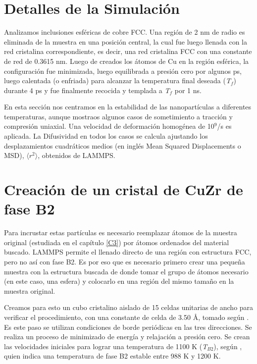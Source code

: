 
\section{Detalles de la Simulación}
\label{S4_1}

Analizamos inclusiones esféricas de cobre FCC. Una región de 2 nm de radio es eliminada de la muestra en una posición central, la cual fue luego llenada con la red cristalina correspondiente, es decir, una red cristalina FCC con una constante de red de 0.3615 nm. Luego de creados los átomos de Cu en la región esférica, la configuración fue minimizada, luego equilibrada a presión cero por algunos ps, luego calentada (o enfriada) para alcanzar la temperatura final deseada (\textit{T$_{f}$}) durante 4 ps y fue finalmente recocida y templada a \textit{T$_{f}$} por 1 ns.

En esta sección nos centramos en la estabilidad de las nanopartículas a diferentes temperaturas, aunque mostraos algunos casos de sometimiento a tracción y compresión uniaxial. Una velocidad de deformación homogénea de 10$^{9}$/s es aplicada. La Difusividad en todos los casos se calcula ajustando los desplazamientos cuadráticos medios (en inglés Mean Squared Displacements o MSD), $\langle r^{2}\rangle$, obtenidos de LAMMPS.

\section{Creación de un cristal de CuZr de fase B2}
\label{S4_2}

Para incrustar estas partículas es necesario reemplazar átomos de la muestra original (estudiada en el capítulo \ref{C3}) por átomos ordenados del material buscado. LAMMPS permite el llenado directo de una región con estructura FCC, pero no así con fase B2. Es por eso que es necesario  primero crear una pequeña muestra con la estructura buscada de donde tomar el grupo de átomos necesario (en este caso, una esfera) y colocarlo en una región del mismo tamaño en la muestra original.

Creamos para esto un cubo cristalino aislado de 15 celdas unitarias de ancho para verificar el procedimiento, con una constante de celda de 3.50 \AA{}, tomado según \cite{inoue04}. Es este paso se utilizan condiciones de borde periódicas en las tres direcciones. Se realiza un proceso de minimizado de energía y relajación a presión cero. Se crean las velocidades iniciales para lograr una temperatura de 1100 K (\textit{T$_{B2}$}), según \cite{pauly10}, quien indica una temperatura de fase B2 estable entre 988 K y 1200 K. 

